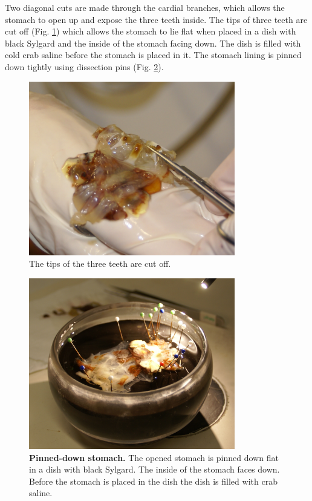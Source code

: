 Two diagonal cuts are made through the cardial branches, which allows the stomach to open up and expose the three teeth inside. The tips of three teeth are cut off (Fig. \ref{fig:dissection_crab14}) which allows the stomach to lie flat when placed in a dish with black Sylgard and the inside of the stomach facing down. The dish is filled with cold crab saline before the stomach is placed in it. The stomach lining is pinned down tightly using dissection pins (Fig. \ref{fig:dissection_crab15}).
\begin{figure}[H]
	\begin{center}
		\includegraphics[width=9cm]{graphics/dissection_crab14.png}
		\caption{The tips of the three teeth are cut off.}
		\label{fig:dissection_crab14}
	\end{center}
\end{figure}
\begin{figure}[H]
	\begin{center}
		\includegraphics[width=9cm]{graphics/dissection_crab15.png}
		\caption[Pinned-down stomach. ]{\textbf{Pinned-down stomach. }The opened stomach is pinned down flat in a dish with black Sylgard. The inside of the stomach faces down. Before the stomach is placed in the dish the dish is filled with crab saline. }
		\label{fig:dissection_crab15}
	\end{center}
\end{figure}

